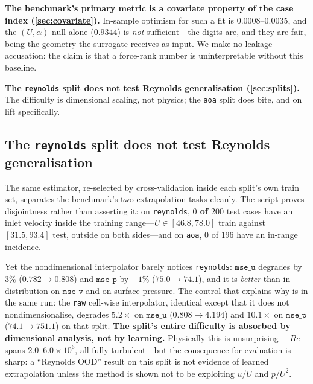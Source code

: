 
\item \textbf{The benchmark's primary metric is a covariate property of the case index
(\autoref{sec:covariate}).} In-sample optimism for such a fit is $0.0008$--$0.0035$, and
the $(U,\alpha)$ null alone ($0.9344$) is \emph{not} sufficient---the digits are, and they
are fair, being the geometry the surrogate receives as input. We make no leakage
accusation: the claim is that a force-rank number is uninterpretable without this
baseline.

\item \textbf{The \texttt{reynolds} split does not test Reynolds generalisation
(\autoref{sec:splits}).} The difficulty is dimensional scaling, not physics; the
\texttt{aoa} split does bite, and on lift specifically.



\subsection{The \texttt{reynolds} split does not test Reynolds generalisation}
\label{sec:splits}

The same estimator, re-selected by cross-validation inside each split's own train set,
separates the benchmark's two extrapolation tasks cleanly. The script proves
disjointness rather than asserting it: on \texttt{reynolds}, \textbf{$0$ of $200$} test
cases have an inlet velocity inside the training range---$U\in[46.8,78.0]$ train
against $[31.5,93.4]$ test, outside on both sides---and on \texttt{aoa},
$0$ of $196$ have an in-range incidence.

Yet the nondimensional interpolator barely notices \texttt{reynolds}: $\texttt{mse\_u}$
degrades by $3\%$ ($0.782\to0.808$) and $\texttt{mse\_p}$ by $-1\%$ ($75.0\to74.1$),
and it is \emph{better} than in-distribution on $\texttt{mse\_v}$ and on surface
pressure. The control that explains why is in the same run: the \texttt{raw}
cell-wise interpolator, identical except that it does not nondimensionalise, degrades
$5.2\times$ on $\texttt{mse\_u}$ ($0.808\to4.194$) and $10.1\times$ on
$\texttt{mse\_p}$ ($74.1\to751.1$) on that split. \textbf{The split's entire difficulty
is absorbed by dimensional analysis, not by learning.} Physically this is unsurprising
---$Re$ spans $2.0$--$6.0\times10^6$, all fully turbulent---but the consequence for
evaluation is sharp: a ``Reynolds OOD'' result on this split is not evidence of learned
extrapolation unless the method is shown not to be exploiting $u/U$ and $p/U^2$.

